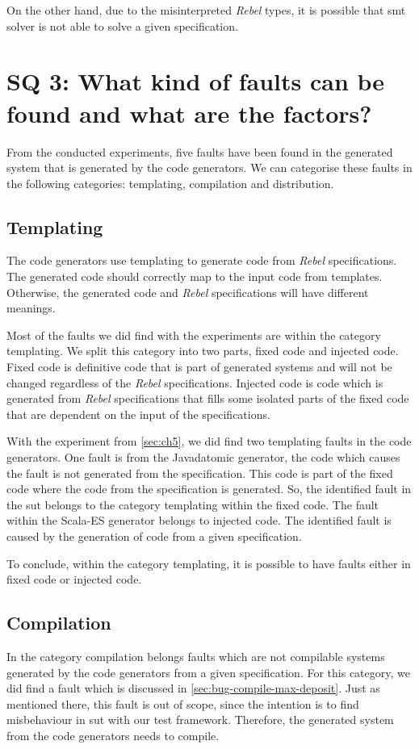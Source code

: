 On the other hand, due to the misinterpreted \textit{Rebel} types, it is
possible that \gls{smt} solver is not able to solve a given specification.

\section{SQ 3: What kind of faults can be found and what are the factors?}

From the conducted experiments, five faults have been found in the
generated system that is generated by the code generators. We can categorise
these faults in the following categories: templating, compilation and
distribution.

\subsection{Templating}
The code generators use templating to generate code from \textit{Rebel}
specifications. The generated code should correctly map to the input code from
templates. Otherwise, the generated code and \textit{Rebel} specifications will
have different meanings.

Most of the faults we did find with the experiments are within the category
templating. We split this category into two parts, fixed code and injected code.
Fixed code is definitive code that is part of generated systems and will not be
changed regardless of the \textit{Rebel} specifications.
Injected code is code which is generated from \textit{Rebel} specifications that
fills some isolated parts of the fixed code that are dependent on the input of
the specifications.

With the experiment from \autoref{sec:ch5}, we did find two templating faults in the code
generators. One fault is from the Javadatomic generator, the code which causes the
fault is not generated from the specification. This code is part of the fixed code
where the code from the specification is generated. So, the identified fault in
the \gls{sut} belongs to the category templating within the fixed code.
The fault within the Scala-ES generator belongs to injected code. The identified fault is
caused by the generation of code from a given specification.

To conclude, within
the category templating, it is possible to have faults either in fixed code or
injected code.

\subsection{Compilation}
In the category compilation belongs faults which are not compilable systems
generated by the code generators from a given specification. For this category,
we did find a fault which is discussed in \autoref{sec:bug-compile-max-deposit}.
Just as mentioned there, this fault is out of scope, since the intention is to
find misbehaviour in \gls{sut} with our test framework.
Therefore, the generated system from the code generators needs to compile.

